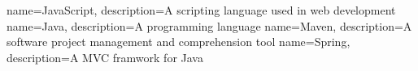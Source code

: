  		{ name=JavaScript,	description={A scripting language used in web development}}
		{ name=Java,		description={A programming language }}
	{ name=Maven,		description={A software project management and comprehension tool }}
 { name=Spring,		description={A MVC framwork for Java }}

